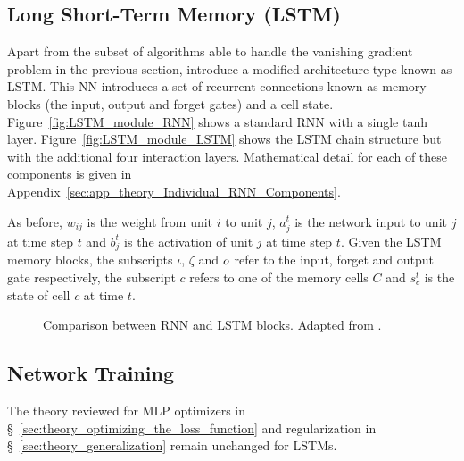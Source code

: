 \subsection[Long Short-Term Memory]{Long Short-Term Memory (LSTM)}
Apart from the subset of algorithms able to handle the vanishing gradient problem in the previous section, \cite{Hochreiter1997} introduce a modified architecture type known as \ac{LSTM}. This NN introduces a set of recurrent connections known as memory blocks (the input, output and forget gates) and a cell state. Figure~\ref{fig:LSTM_module_RNN} shows a standard RNN with a single tanh layer. Figure~\ref{fig:LSTM_module_LSTM} shows the LSTM chain structure but with the additional four interaction layers. Mathematical detail for each of these components is given in Appendix~\ref{sec:app_theory_Individual_RNN_Components}.

As before, $w_{ij}$ is the weight from unit $i$ to unit $j$, $a_j^t$ is the network input to unit $j$ at time step $t$ and $b_j^t$ is the activation of unit $j$ at time step $t$. Given the LSTM memory blocks, the subscripts $\iota$, $\zeta$ and $o$ refer to the input, forget and output gate respectively, the subscript $c$ refers to one of the memory cells $C$ and $s_c^t$ is the state of cell $c$ at time $t$. 

\begin{figure}[!ht]
	\centering
	\caption[Comparison between RNN and LSTM blocks.]{Comparison between RNN and LSTM blocks. Adapted from \cite{Olah2015}.}        
	\label{fig:RNN_LSTM_blocks}
\end{figure}

\subsection{Network Training}
The theory reviewed for MLP optimizers in §~\ref{sec:theory_optimizing_the_loss_function} and regularization in §~\ref{sec:theory_generalization} remain unchanged for LSTMs.

